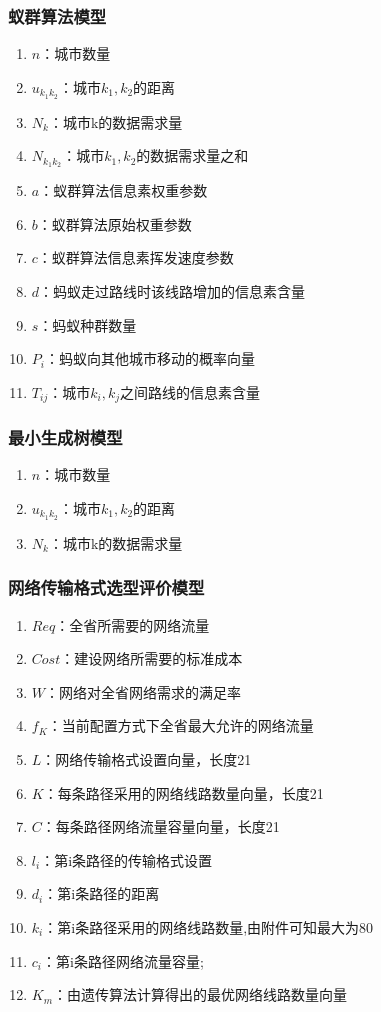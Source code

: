 \documentclass[UTF8,12pt]{ctexart}
\begin{document}
      \subsubsection{蚁群算法模型}
        \begin{enumerate}
            \item $n$：城市数量
            \item $u_{k_1k_2}$：城市$k_1,k_2$的距离
            \item $N_k$：城市k的数据需求量
            \item $N_{k_1k_2}$：城市$k_1,k_2$的数据需求量之和
            \item $a$：蚁群算法信息素权重参数
            \item $b$：蚁群算法原始权重参数
            \item $c$：蚁群算法信息素挥发速度参数
            \item $d$：蚂蚁走过路线时该线路增加的信息素含量
            \item $s$：蚂蚁种群数量
            \item $P_i$：蚂蚁向其他城市移动的概率向量
            \item $T_{ij}$：城市$k_i,k_j$之间路线的信息素含量
        \end{enumerate}
      \subsubsection{最小生成树模型}
        \begin{enumerate}
            \item $n$：城市数量
            \item $u_{k_1k_2}$：城市$k_1,k_2$的距离
            \item $N_k$：城市k的数据需求量
        \end{enumerate}
      \subsubsection{网络传输格式选型评价模型}
        \begin{enumerate}
            \item $Req$：全省所需要的网络流量
            \item $Cost$：建设网络所需要的标准成本
            \item $W$：网络对全省网络需求的满足率
            \item $f_K$：当前配置方式下全省最大允许的网络流量
            \item $L$：网络传输格式设置向量，长度21
            \item $K$：每条路径采用的网络线路数量向量，长度21
            \item $C$：每条路径网络流量容量向量，长度21
            \item $l_i$：第i条路径的传输格式设置
            \item $d_i$：第i条路径的距离
            \item $k_i$：第i条路径采用的网络线路数量,由附件可知最大为80
            \item $c_i$：第i条路径网络流量容量;
            \item $K_m$：由遗传算法计算得出的最优网络线路数量向量
        \end{enumerate}
\end{document}
